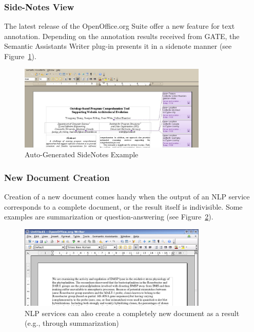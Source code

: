 \subsubsection{Side-Notes View}
The latest release of the OpenOffice.org Suite offer a new feature for text
annotation.  Depending on the annotation results received from GATE, the
Semantic Assistants Writer plug-in presents it in a sidenote manner (see
Figure~\ref{fig:sidenotes}).
\begin{figure}[htb]
  \centering
  \includegraphics[width=0.8\textwidth]{pictures/sidenotes.jpg}
  \caption{Auto-Generated SideNotes Example}
  \label{fig:sidenotes}
\end{figure}

\subsubsection{New Document Creation}
\label{sec:doc-cre}
Creation of a new document comes handy when the output of an NLP service
corresponds to a complete document, or the result itself is indivisible. Some
examples are summarization or question-answering (see Figure~\ref{fig:oores}).

\begin{figure}[htb]
  \centering
  \includegraphics[width=0.8\textwidth]{pictures/ooresult_clip.jpg}
  \vspace*{-2mm}
  \caption{NLP services can also create a completely new document as a
  result (e.g., through summarization)}
  \label{fig:oores}
\end{figure}

